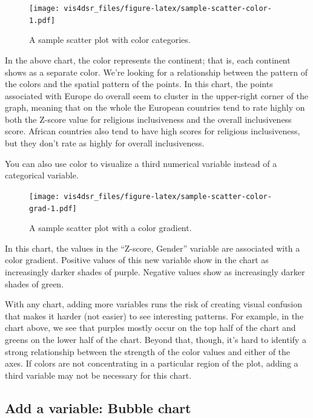 \documentclass[
]{krantz}
\begin{document}
\begin{figure}
\centering
\texttt{[image: vis4dsr\_files/figure-latex/sample-scatter-color-1.pdf]}
\caption{\label{fig:sample-scatter-color}A sample scatter plot with color categories.}
\end{figure}

In the above chart, the color represents the continent; that is, each continent shows
as a separate color. We're looking for a relationship between the pattern of the colors
and the spatial pattern of the points. In this chart, the points associated with
Europe do overall seem to cluster in the upper-right corner of the graph, meaning that
on the whole the European countries tend to rate highly on both the Z-score value
for religious inclusiveness and the overall inclusiveness score. African countries
also tend to have high scores for religious inclusiveness, but they don't rate as
highly for overall inclusiveness.

You can also use color to visualize a third numerical variable instead of a
categorical variable.

\begin{figure}
\centering
\texttt{[image: vis4dsr\_files/figure-latex/sample-scatter-color-grad-1.pdf]}
\caption{\label{fig:sample-scatter-color-grad}A sample scatter plot with a color gradient.}
\end{figure}

In this chart, the values in the ``Z-score, Gender'' variable are associated with
a color gradient. Positive values of this new variable show in the chart as
increasingly darker shades of purple. Negative values show as increasingly darker
shades of green.

With any chart, adding more variables runs the risk of creating visual confusion
that makes it harder (not easier) to see interesting patterns. For example,
in the chart above, we see that purples mostly occur on the top half of the chart
and greens on the lower half of the chart. Beyond that, though, it's hard to identify
a strong relationship between the strength of the color values and either of the axes.
If colors are not concentrating in a particular region of the plot, adding a third
variable may not be necessary for this chart.

\hypertarget{add-a-variable-bubble-chart}{%
\subsection{Add a variable: Bubble chart}\label{add-a-variable-bubble-chart}}
\end{document}
